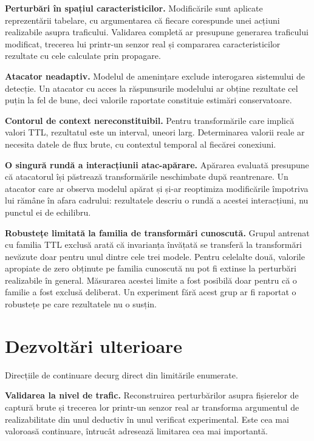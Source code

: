 \textbf{Perturbări în spațiul caracteristicilor.} Modificările sunt aplicate reprezentării tabelare, cu argumentarea că fiecare corespunde unei acțiuni realizabile asupra traficului. Validarea completă ar presupune generarea traficului modificat, trecerea lui printr-un senzor real și compararea caracteristicilor rezultate cu cele calculate prin propagare.

\textbf{Atacator neadaptiv.} Modelul de amenințare exclude interogarea sistemului de detecție. Un atacator cu acces la răspunsurile modelului ar obține rezultate cel puțin la fel de bune, deci valorile raportate constituie estimări conservatoare.

\textbf{Contorul de context nereconstituibil.} Pentru transformările care implică valori TTL, rezultatul este un interval, uneori larg. Determinarea valorii reale ar necesita datele de flux brute, cu contextul temporal al fiecărei conexiuni.

\textbf{O singură rundă a interacțiunii atac-apărare.} Apărarea evaluată presupune că atacatorul își păstrează transformările neschimbate după reantrenare. Un atacator care ar observa modelul apărat și și-ar reoptimiza modificările împotriva lui rămâne în afara cadrului: rezultatele descriu o rundă a acestei interacțiuni, nu punctul ei de echilibru.

\textbf{Robustețe limitată la familia de transformări cunoscută.} Grupul antrenat cu familia TTL exclusă arată că invarianța învățată se transferă la transformări nevăzute doar pentru unul dintre cele trei modele. Pentru celelalte două, valorile apropiate de zero obținute pe familia cunoscută nu pot fi extinse la perturbări realizabile în general. Măsurarea acestei limite a fost posibilă doar pentru că o familie a fost exclusă deliberat. Un experiment fără acest grup ar fi raportat o robustețe pe care rezultatele nu o susțin.

\section{Dezvoltări ulterioare}\label{sec:dezvoltari}

Direcțiile de continuare decurg direct din limitările enumerate.

\textbf{Validarea la nivel de trafic.} Reconstruirea perturbărilor asupra fișierelor de captură brute și trecerea lor printr-un senzor real ar transforma argumentul de realizabilitate din unul deductiv în unul verificat experimental. Este cea mai valoroasă continuare, întrucât adresează limitarea cea mai importantă.

